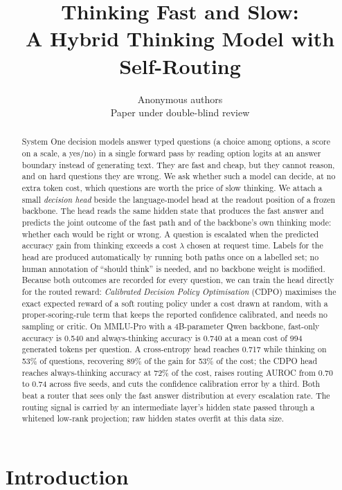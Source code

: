\documentclass{article}
\title{Thinking Fast and Slow:\\A Hybrid Thinking Model with Self-Routing}
\author{Anonymous authors\\
Paper under double-blind review}
\newcommand{\cdpo}{CDPO}
\begin{document}
\maketitle

\begin{abstract}
System One decision models answer typed questions (a choice among options, a score on a scale, a yes/no) in a single forward pass by reading option logits at an answer boundary instead of generating text. They are fast and cheap, but they cannot reason, and on hard questions they are wrong. We ask whether such a model can decide, at no extra token cost, which questions are worth the price of slow thinking. We attach a small \emph{decision head} beside the language-model head at the readout position of a frozen backbone. The head reads the same hidden state that produces the fast answer and predicts the joint outcome of the fast path and of the backbone's own thinking mode: whether each would be right or wrong. A question is escalated when the predicted accuracy gain from thinking exceeds a cost $\lambda$ chosen at request time. Labels for the head are produced automatically by running both paths once on a labelled set; no human annotation of ``should think'' is needed, and no backbone weight is modified. Because both outcomes are recorded for every question, we can train the head directly for the routed reward: \emph{Calibrated Decision Policy Optimisation} (\cdpo) maximises the exact expected reward of a soft routing policy under a cost drawn at random, with a proper-scoring-rule term that keeps the reported confidence calibrated, and needs no sampling or critic. On MMLU-Pro with a 4B-parameter Qwen backbone, fast-only accuracy is 0.540 and always-thinking accuracy is 0.740 at a mean cost of 994 generated tokens per question. A cross-entropy head reaches 0.717 while thinking on 53\% of questions, recovering 89\% of the gain for 53\% of the cost; the \cdpo{} head reaches always-thinking accuracy at 72\% of the cost, raises routing AUROC from 0.70 to 0.74 across five seeds, and cuts the confidence calibration error by a third. Both beat a router that sees only the fast answer distribution at every escalation rate. The routing signal is carried by an intermediate layer's hidden state passed through a whitened low-rank projection; raw hidden states overfit at this data size.
\end{abstract}

\section{Introduction}
\end{document}
